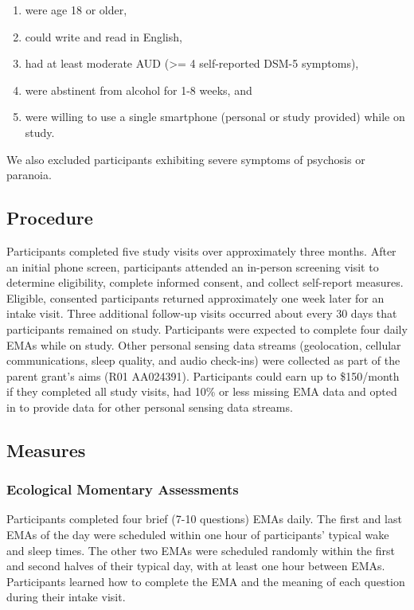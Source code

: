 \documentclass[
]{agujournal2019}
\providecommand{\tightlist}{%
  \setlength{\itemsep}{0pt}\setlength{\parskip}{0pt}}\usepackage{longtable,booktabs,array}
\begin{document}
\begin{enumerate}
\def\labelenumi{\arabic{enumi}.}
\tightlist
\item
  were age 18 or older,
\item
  could write and read in English,
\item
  had at least moderate AUD (\textgreater= 4 self-reported DSM-5
  symptoms),
\item
  were abstinent from alcohol for 1-8 weeks, and
\item
  were willing to use a single smartphone (personal or study provided)
  while on study.
\end{enumerate}

We also excluded participants exhibiting severe symptoms of psychosis or
paranoia.

\subsection{Procedure}\label{procedure}

Participants completed five study visits over approximately three
months. After an initial phone screen, participants attended an
in-person screening visit to determine eligibility, complete informed
consent, and collect self-report measures. Eligible, consented
participants returned approximately one week later for an intake visit.
Three additional follow-up visits occurred about every 30 days that
participants remained on study. Participants were expected to complete
four daily EMAs while on study. Other personal sensing data streams
(geolocation, cellular communications, sleep quality, and audio
check-ins) were collected as part of the parent grant's aims (R01
AA024391). Participants could earn up to \$150/month if they completed
all study visits, had 10\% or less missing EMA data and opted in to
provide data for other personal sensing data streams.

\subsection{Measures}\label{measures}

\subsubsection{Ecological Momentary
Assessments}\label{ecological-momentary-assessments}

Participants completed four brief (7-10 questions) EMAs daily. The first
and last EMAs of the day were scheduled within one hour of participants'
typical wake and sleep times. The other two EMAs were scheduled randomly
within the first and second halves of their typical day, with at least
one hour between EMAs. Participants learned how to complete the EMA and
the meaning of each question during their intake visit.
\end{document}

